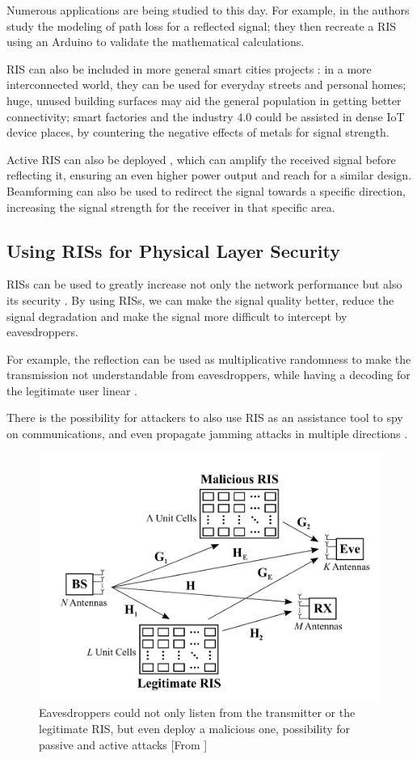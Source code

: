 Numerous applications are being studied to this day. For example, in \cite{9881509} the authors study the modeling of path loss for a reflected signal; they then recreate a RIS using an Arduino to validate the mathematical calculations.

RIS can also be included in more general smart cities projects \cite{9253607}: in a more interconnected world, they can be used for everyday streets and personal homes; huge, unused building surfaces may aid the general population in getting better connectivity; smart factories and the industry 4.0 could be assisted in dense IoT device places, by countering the negative effects of metals for signal strength.

Active RIS can also be deployed \cite{9377648}, which can amplify the received signal before reflecting it, ensuring an even higher power output and reach for a similar design. Beamforming can also be used to redirect the signal towards a specific direction, increasing the signal strength for the receiver in that specific area.

\subsection{Using RISs for Physical Layer Security}

RISs can be used to greatly increase not only the network performance but also its security \cite{10409564}. By using RISs, we can make the signal quality better, reduce the signal degradation and make the signal more difficult to intercept by eavesdroppers.

For example, the reflection can be used as multiplicative randomness to make the transmission not understandable from eavesdroppers, while having a decoding for the legitimate user linear \cite{9328149}.

There is the possibility for attackers to also use RIS as an assistance tool to spy on communications, and even propagate jamming attacks in multiple directions \cite{10143983}.

\begin{figure}[H]
  \centering
  \includegraphics[width=0.5\linewidth]{imgs/RIS malicious.png}
  \caption{Eavesdroppers could not only listen from the transmitter or the legitimate RIS, but even deploy a malicious one, possibility for passive and active attacks [From \cite{10143983}]}
\end{figure}

